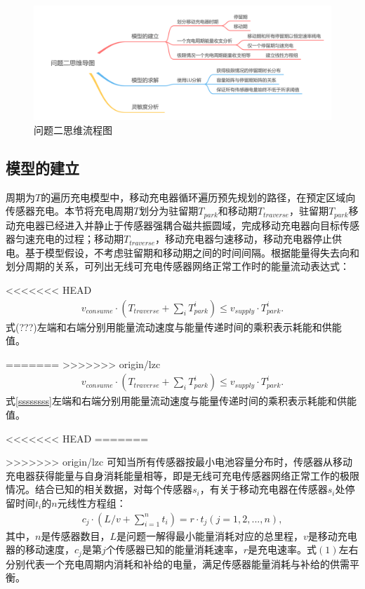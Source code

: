 \documentclass{whutmod}
\begin{document}
\begin{table}[H]
\begin{tablenotes}
			\begin{figure}[H]
				\centering
				\includegraphics[width=\textwidth]{figures/222222.png}
				\caption{问题二思维流程图}\label{ssssct}

			\end{figure}
		
		\subsection{模型的建立}
			周期为$T$的遍历充电模型中，移动充电器循环遍历预先规划的路径，在预定区域向传感器充电。本节将充电周期$T$划分为驻留期$T_{park}$和移动期$T_{traverse}$，驻留期$T_{park}$移动充电器已经进入并静止于传感器强耦合磁共振圆域，完成移动充电器向目标传感器匀速充电的过程；移动期$T_{traverse}$，移动充电器匀速移动，移动充电器停止供电。基于模型假设，不考虑驻留期和移动期之间的时间间隔。根据能量得失去向和划分周期的关系，可列出无线可充电传感器网络正常工作时的能量流动表达式：

<<<<<<< HEAD
			\begin{gather}
			v_{consume}\cdot (T_{traverse}+\sum_{i} T_{park}^i)\leq v_{supply}\cdot T_{park}^i.
			\end{gather}
			式(???)左端和右端分别用能量流动速度与能量传递时间的乘积表示耗能和供能值。

=======
>>>>>>> origin/lzc
			\begin{gather}\label{ssssssss}
			v_{consume}\cdot (T_{traverse}+\sum_{i} T_{park}^i)\leq v_{supply}\cdot T_{park}^i.
			\end{gather}
			式\ref{ssssssss}左端和右端分别用能量流动速度与能量传递时间的乘积表示耗能和供能值。

<<<<<<< HEAD
=======
			
>>>>>>> origin/lzc
			可知当所有传感器按最小电池容量分布时，传感器从移动充电器获得能量与自身消耗能量相等，即是无线可充电传感器网络正常工作的极限情况。结合已知的相关数据，对每个传感器$s_i$，有关于移动充电器在传感器$s_i$处停留时间$t_i$的$n$元线性方程组：
			\begin{gather}
			c_{j} \cdot (L/v+\sum_{i=1}^{n}t_i)=r \cdot t_j (j=1,2,...,n),
			\end{gather}
			其中，$n$是传感器数目，$L$是问题一解得最小能量消耗对应的总里程，$v$是移动充电器的移动速度，$c_{j}$是第$j$个传感器已知的能量消耗速率，$r$是充电速率。式$(1)$左右分别代表一个充电周期内消耗和补给的电量，满足传感器能量消耗与补给的供需平衡。
			

\end{tablenotes}
\end{table}
\end{document}
